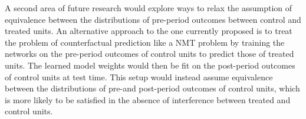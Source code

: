 \documentclass[hidelinks,12pt]{article}
\begin{document}
A second area of future research would explore ways to relax the assumption of equivalence between the distributions of pre-period outcomes between control and treated units. An alternative approach to the one currently proposed is to treat the problem of counterfactual prediction like a NMT problem by training the networks on the pre-period outcomes of control units to predict those of treated units. The learned model weights would then be fit on the post-period outcomes of control units at test time. This setup would instead assume equivalence between the distributions of pre-and post-period outcomes of control units, which is more likely to be satisfied in the absence of interference between treated and control units. 

\newpage


\begin{singlespace}
	\begin{footnotesize}
		\begin{multicols}{2}
			
		\end{multicols}
	\end{footnotesize}
\end{singlespace}

\newpage
\end{document}
